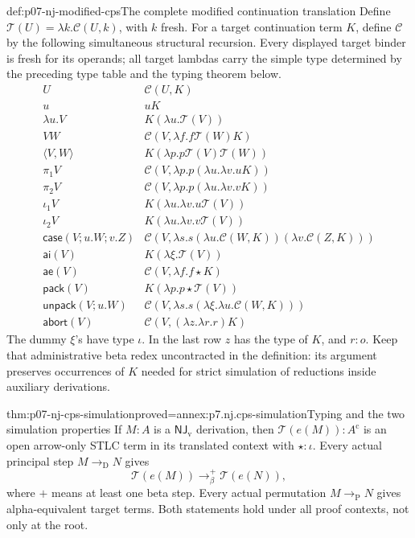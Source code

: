 \begin{hbdefinition}{def:p07-nj-modified-cps}{The complete modified continuation translation}
Define \(\mathcal T(U)=\lambda k.\mathcal C(U,k)\), with
\(k\) fresh. For a target continuation term \(K\), define
\(\mathcal C\) by the following simultaneous structural recursion.
Every displayed target binder is fresh for its operands; all
target lambdas carry the simple type determined by the preceding
type table and the typing theorem below.
\[
\begin{array}{c|l}
U&\mathcal C(U,K)\\ \hline
u&uK\\
\lambda u.V&K(\lambda u.\mathcal T(V))\\
VW&\mathcal C(V,\lambda f.f\mathcal T(W)K)\\
\langle V,W\rangle&K(\lambda p.p\mathcal T(V)\mathcal T(W))\\
\pi_1V&\mathcal C(V,\lambda p.p(\lambda u.\lambda v.uK))\\
\pi_2V&\mathcal C(V,\lambda p.p(\lambda u.\lambda v.vK))\\
\iota_1V&K(\lambda u.\lambda v.u\mathcal T(V))\\
\iota_2V&K(\lambda u.\lambda v.v\mathcal T(V))\\
\mathsf{case}(V;u.W;v.Z)&
 \mathcal C(V,\lambda s.s(\lambda u.\mathcal C(W,K))
                               (\lambda v.\mathcal C(Z,K)))\\
\mathsf{ai}(V)&K(\lambda\xi.\mathcal T(V))\\
\mathsf{ae}(V)&\mathcal C(V,\lambda f.f\star K)\\
\mathsf{pack}(V)&K(\lambda p.p\star\mathcal T(V))\\
\mathsf{unpack}(V;u.W)&
 \mathcal C(V,\lambda s.s(\lambda\xi.\lambda u.\mathcal C(W,K)))\\
\mathsf{abort}(V)&\mathcal C(V,(\lambda z.\lambda r.r)K)
\end{array}
\]
The dummy \(\xi\)'s have type \(\iota\). In the last row
\(z\) has the type of \(K\), and \(r:o\). Keep that
administrative beta redex uncontracted in the definition: its
argument preserves occurrences of \(K\) needed for strict
simulation of reductions inside auxiliary derivations.
\end{hbdefinition}

\begin{hbtheorem}{thm:p07-nj-cps-simulation}{proved=annex:p7.nj.cps-simulation}{Typing and the two simulation properties}
If \(M:A\) is a \(\mathsf{NJ}_{\mathrm v}\) derivation, then
\(\mathcal T(e(M)):A^{\mathrm c}\) is an open arrow-only STLC
term in its translated context with \(\star:\iota\).
Every actual principal step \(M\to_{\mathrm D}N\) gives
\[
             \mathcal T(e(M))\to_\beta^+
                          \mathcal T(e(N)),
\]
where \(+\) means at least one beta step. Every actual
permutation \(M\to_{\mathrm P}N\) gives alpha-equivalent
target terms. Both statements hold under all proof contexts,
not only at the root.
\end{hbtheorem}

